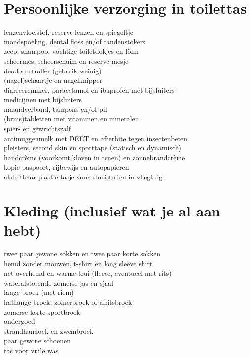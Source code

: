 \documentclass[9pt,twocolumn]{memoir}
\begin{document}
\section*{Persoonlijke verzorging in toilettas}%
lenzenvloeistof, reserve lenzen en spiegeltje\\%
mondspoeling, dental floss en/of tandenstokers\\%
zeep, shampoo, vochtige toiletdokjes en föhn\\%
scheermes, scheerschuim en reserve mesje\\%
deodorantroller (gebruik weinig)\\%
(nagel)schaartje en nagelknipper\\%
diarreeremmer, paracetamol en ibuprofen met bijsluiters\\%
medicijnen met bijsluiters\\%
maandverband, tampons en/of pil\\%
(bruis)tabletten met vitaminen en mineralen\\%
spier- en gewrichtszalf\\%
antimuggenmelk met DEET en afterbite tegen insectenbeten\\%
pleisters, second skin en sporttape (statisch en dynamisch)\\%
handcrème (voorkomt kloven in tenen) en zonnebrandcrème\\%
kopie paspoort, rijbewijs en autopapieren\\%
afsluitbaar plastic tasje voor vloeistoffen in vliegtuig%

\section*{Kleding (inclusief wat je al aan hebt)}%
twee paar gewone sokken en twee paar korte sokken\\%
hemd zonder mouwen, t-shirt en long sleeve shirt\\%
net overhemd en warme trui (fleece, eventueel met rits)\\%
waterafstotende zomerse jas en sjaal\\%
lange broek (met riem)\\%
halflange broek, zomerbroek of afritsbroek\\%
zomerse korte sportbroek\\%
ondergoed\\%
strandhandoek en zwembroek\\%
paar gewone schoenen\\%
tas voor vuile was%
\end{document}
